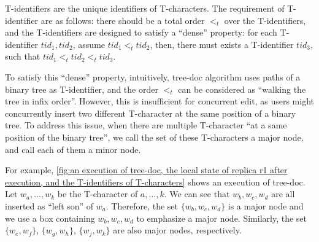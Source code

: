 T-identifiers are the unique identifiers of T-characters. The requirement of T-identifier are as follows: there should be a total order $<_t$ over the T-identifiers, and the T-identifiers are designed to satisfy a ``dense'' property: for each T-identifier $tid_1,tid_2$, assume $tid_1 <_t tid_2$, then, there must exists a T-identifier $tid_3$, such that $tid_1 <_t tid_2 <_t tid_3$.

To satisfy this ``dense'' property, intuitively, tree-doc algorithm uses paths of a binary tree as T-identifier, and the order $<_t$ can be considered as ``walking the tree in infix order''. However, this is insufficient for concurrent edit, as users might concurrently insert two different T-character at the same position of a binary tree. To address this issue, when there are multiple T-character ``at a same position of the binary tree'', we call the set of these T-characters a major node, and call each of them a minor node.

For example, \autoref{fig:an execution of tree-doc, the local state of replica r1 after execution, and the T-identifiers of T-characters} shows an execution of tree-doc. Let $w_a,\ldots,w_k$ be the T-character of $a,\ldots,k$. We can see that $w_b,w_c,w_d$ are all inserted as ``left son'' of $w_a$. Therefore, the set $\{ w_b,w_c,w_d \}$ is a major node and we use a box containing $w_b,w_c,w_d$ to emphasize a major node. Similarly, the set $\{ w_e,w_f \}$, $\{ w_g,w_h \}$, $\{ w_j,w_k \}$ are also major nodes, respectively.



